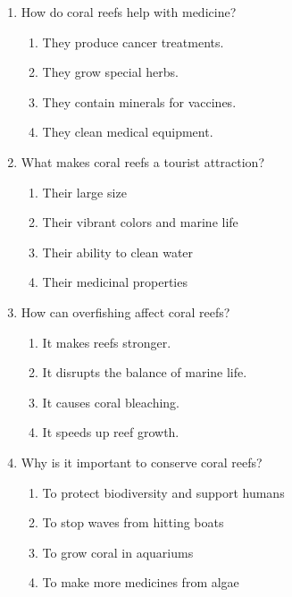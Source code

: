 \documentclass[12pt]{article}
\begin{document}
\begin{enumerate}
\item How do coral reefs help with medicine?
\begin{enumerate}[label=\Alph*.]
    \item They produce cancer treatments.
    \item They grow special herbs.
    \item They contain minerals for vaccines.
    \item They clean medical equipment.
\end{enumerate}

\item What makes coral reefs a tourist attraction?
\begin{enumerate}[label=\Alph*.]
    \item Their large size
    \item Their vibrant colors and marine life
    \item Their ability to clean water
    \item Their medicinal properties
\end{enumerate}

\item How can overfishing affect coral reefs?
\begin{enumerate}[label=\Alph*.]
    \item It makes reefs stronger.
    \item It disrupts the balance of marine life.
    \item It causes coral bleaching.
    \item It speeds up reef growth.
\end{enumerate}

\item Why is it important to conserve coral reefs?
\begin{enumerate}[label=\Alph*.]
    \item To protect biodiversity and support humans
    \item To stop waves from hitting boats
    \item To grow coral in aquariums
    \item To make more medicines from algae
\end{enumerate}

\end{enumerate}
\end{document}
